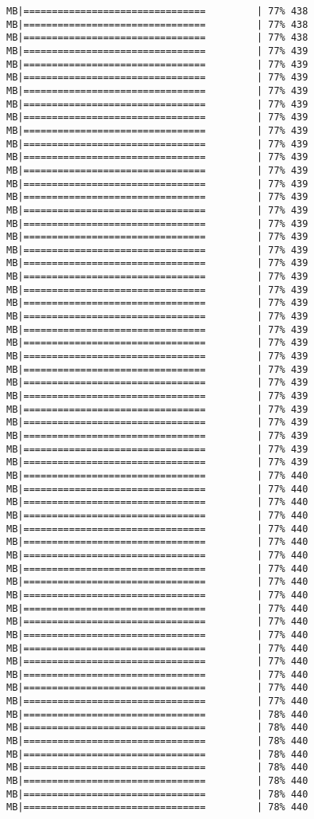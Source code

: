 \documentclass[
]{article}
\begin{document}
\begin{verbatim}
MB|================================         | 77% 438 MB|================================         | 77% 438 MB|================================         | 77% 438 MB|================================         | 77% 439 MB|================================         | 77% 439 MB|================================         | 77% 439 MB|================================         | 77% 439 MB|================================         | 77% 439 MB|================================         | 77% 439 MB|================================         | 77% 439 MB|================================         | 77% 439 MB|================================         | 77% 439 MB|================================         | 77% 439 MB|================================         | 77% 439 MB|================================         | 77% 439 MB|================================         | 77% 439 MB|================================         | 77% 439 MB|================================         | 77% 439 MB|================================         | 77% 439 MB|================================         | 77% 439 MB|================================         | 77% 439 MB|================================         | 77% 439 MB|================================         | 77% 439 MB|================================         | 77% 439 MB|================================         | 77% 439 MB|================================         | 77% 439 MB|================================         | 77% 439 MB|================================         | 77% 439 MB|================================         | 77% 439 MB|================================         | 77% 439 MB|================================         | 77% 439 MB|================================         | 77% 439 MB|================================         | 77% 439 MB|================================         | 77% 439 MB|================================         | 77% 439 MB|================================         | 77% 440 MB|================================         | 77% 440 MB|================================         | 77% 440 MB|================================         | 77% 440 MB|================================         | 77% 440 MB|================================         | 77% 440 MB|================================         | 77% 440 MB|================================         | 77% 440 MB|================================         | 77% 440 MB|================================         | 77% 440 MB|================================         | 77% 440 MB|================================         | 77% 440 MB|================================         | 77% 440 MB|================================         | 77% 440 MB|================================         | 77% 440 MB|================================         | 77% 440 MB|================================         | 77% 440 MB|================================         | 77% 440 MB|================================         | 78% 440 MB|================================         | 78% 440 MB|================================         | 78% 440 MB|================================         | 78% 440 MB|================================         | 78% 440 MB|================================         | 78% 440 MB|================================         | 78% 440 MB|================================         | 78% 440 
\end{verbatim}
\end{document}
